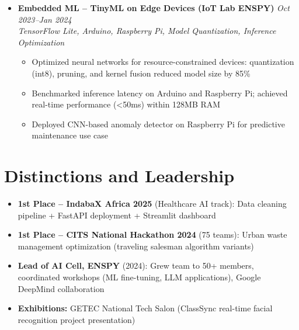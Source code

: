 \documentclass[a4paper,11pt]{article}
\begin{document}
\begin{itemize}[leftmargin=*, label={-}]
\item \textbf{Embedded ML -- TinyML on Edge Devices (IoT Lab ENSPY)} \hfill \textit{Oct 2023--Jan 2024} \\
\textit{TensorFlow Lite, Arduino, Raspberry Pi, Model Quantization, Inference Optimization} \vspace{-2pt}
    \begin{itemize}[leftmargin=0.4cm, nosep, label=\tiny$\bullet$]
        \item Optimized neural networks for resource-constrained devices: quantization (int8), pruning, and kernel fusion reduced model size by 85\%
        \item Benchmarked inference latency on Arduino and Raspberry Pi; achieved real-time performance (<50ms) within 128MB RAM
        \item Deployed CNN-based anomaly detector on Raspberry Pi for predictive maintenance use case
    \end{itemize}

\end{itemize}

\vspace{4pt}

\section{Distinctions and Leadership}
\begin{itemize}[leftmargin=*, nosep]
    \item \textbf{1st Place -- IndabaX Africa 2025} (Healthcare AI track): Data cleaning pipeline + FastAPI deployment + Streamlit dashboard
    \item \textbf{1st Place -- CITS National Hackathon 2024} (75 teams): Urban waste management optimization (traveling salesman algorithm variants)
    \item \textbf{Lead of AI Cell, ENSPY} (2024): Grew team to 50+ members, coordinated workshops (ML fine-tuning, LLM applications), Google DeepMind collaboration
    \item \textbf{Exhibitions:} GETEC National Tech Salon (ClassSync real-time facial recognition project presentation)
\end{itemize}
\end{document}
